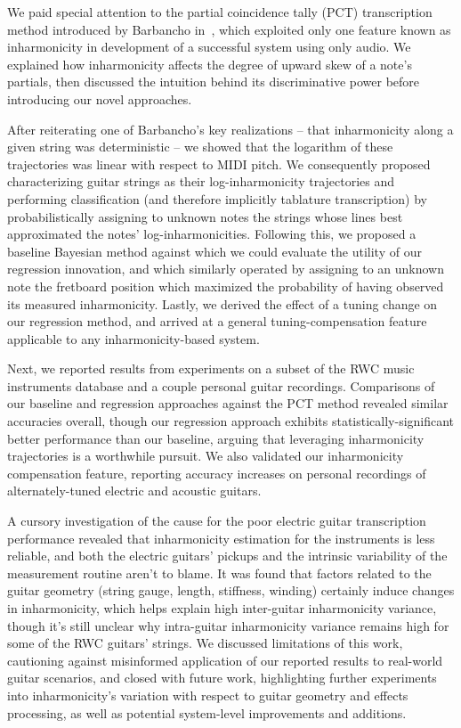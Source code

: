 \documentclass[12pt]{cmuthesis}
\begin{document}
We paid special attention to the partial coincidence tally (PCT) transcription method introduced by Barbancho in~\cite{barbanchoi2012}, which exploited only one feature known as inharmonicity in development of a successful system using only audio. We explained how inharmonicity affects the degree of upward skew of a note's partials, then discussed the intuition behind its discriminative power before introducing our novel approaches.

After reiterating one of Barbancho's key realizations -- that inharmonicity along a given string was deterministic -- we showed that the logarithm of these trajectories was linear with respect to MIDI pitch. We consequently proposed characterizing guitar strings as their log-inharmonicity trajectories and performing classification (and therefore implicitly tablature transcription) by probabilistically assigning to unknown notes the strings whose lines best approximated the notes' log-inharmonicities. Following this, we proposed a baseline Bayesian method against which we could evaluate the utility of our regression innovation, and which similarly operated by assigning to an unknown note the fretboard position which maximized the probability of having observed its measured inharmonicity. Lastly, we derived the effect of a tuning change on our regression method, and arrived at a general tuning-compensation feature applicable to any inharmonicity-based system.

Next, we reported results from experiments on a subset of the RWC music instruments database and a couple personal guitar recordings. Comparisons of our baseline and regression approaches against the PCT method revealed similar accuracies overall, though our regression approach exhibits statistically-significant better performance than our baseline, arguing that leveraging inharmonicity trajectories is a worthwhile pursuit. We also validated our inharmonicity compensation feature, reporting accuracy increases on personal recordings of alternately-tuned electric and acoustic guitars.

A cursory investigation of the cause for the poor electric guitar transcription performance revealed that inharmonicity estimation for the instruments is less reliable, and both the electric guitars' pickups and the intrinsic variability of the measurement routine aren't to blame. It was found that factors related to the guitar geometry (string gauge, length, stiffness, winding) certainly induce changes in inharmonicity, which helps explain high inter-guitar inharmonicity variance, though it's still unclear why intra-guitar inharmonicity variance remains high for some of the RWC guitars' strings. We discussed limitations of this work, cautioning against misinformed application of our reported results to real-world guitar scenarios, and closed with future work, highlighting further experiments into inharmonicity's variation with respect to guitar geometry and effects processing, as well as potential system-level improvements and additions.
\end{document}
